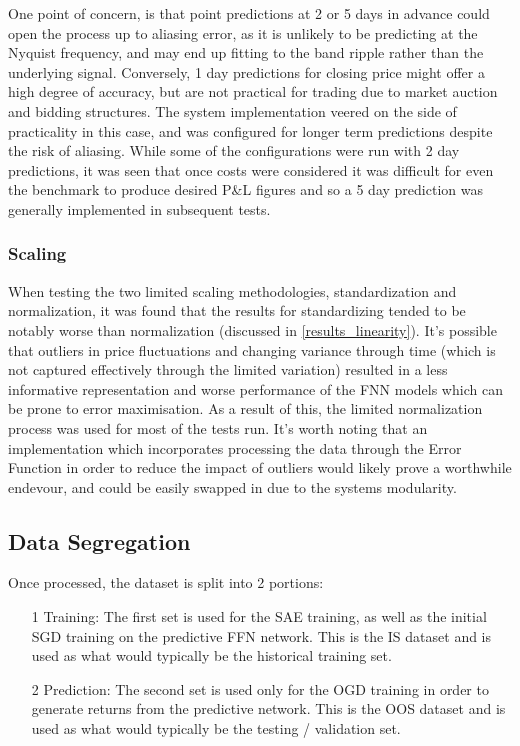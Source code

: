 \documentclass[a4paper,11pt,oneside]{article}
\theoremstyle{plain}
\theoremstyle{definition}
\begin{document}
	One point of concern, is that point predictions at 2 or 5 days in advance could open the process up to aliasing error, as it is unlikely to be predicting at the Nyquist frequency, and may end up fitting to the band ripple rather than the underlying signal. Conversely, 1 day predictions for closing price might offer a high degree of accuracy, but are not practical for trading due to market auction and bidding structures. The system implementation veered on the side of practicality in this case, and was configured for longer term predictions despite the risk of aliasing. While some of the configurations were run with 2 day predictions, it was seen that once costs were considered it was difficult for even the benchmark to produce desired P\&L figures and so a 5 day prediction was generally implemented in subsequent tests.
	
	
	
	\subsubsection {Scaling} When testing the two limited scaling methodologies, standardization and normalization, it was found that the results for standardizing tended to be notably worse than normalization (discussed in \ref{results_linearity}). It's possible that outliers in price fluctuations and changing variance through time (which is not captured effectively through the limited variation) resulted in a less informative representation and worse performance of the FNN models which can be prone to error maximisation. As a result of this, the limited normalization process was used for most of the tests run. It's worth noting that an implementation which incorporates processing the data through the Error Function in order to reduce the impact of outliers would likely prove a worthwhile endevour, and could be easily swapped in due to the systems modularity.\newline
	
	
	\subsection{Data Segregation}\label{proc_dataseg}
	
	Once processed, the dataset is split into 2 portions: 
	\begin{itemize}
		\item[1] Training: The first set is used for the SAE training, as well as the initial SGD training on the predictive FFN network. This is the IS dataset and is used as what would typically be the historical training set.
		\item[2] Prediction: The second set is used only for the OGD training in order to generate returns from the predictive network. This is the OOS dataset and is used as what would typically be the testing / validation set.
	\end{itemize}
	
\end{document}
